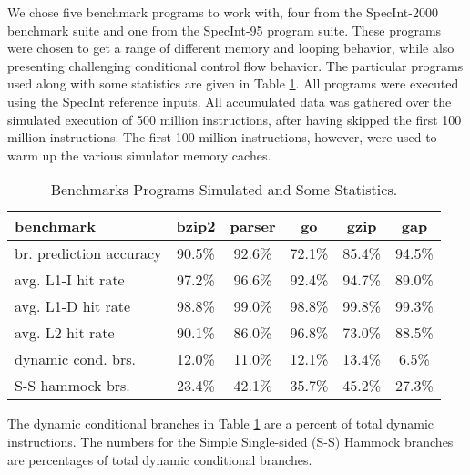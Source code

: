 \documentclass[10pt,dvips]{article}
\begin{document}
We chose five benchmark programs to work with,
four from the SpecInt-2000 benchmark suite
and one from the SpecInt-95 program suite.
These programs were chosen to get a range of different memory and looping
behavior, while also presenting challenging conditional control flow
behavior.
The particular programs used along with some statistics 
are given in Table \ref{tab:benches}.
All programs were executed using the SpecInt reference inputs.
All accumulated data was gathered over the simulated execution of
500 million instructions,
after having skipped the first 100 million instructions.
The first 100 million instructions, however, were used to warm up the
various simulator memory caches.
%
\begin{table}
\begin{center}
\caption{Benchmarks Programs Simulated and Some Statistics.}
\label{tab:benches}
\begin{tabular}{|l|c|c|c|c|c|}
\hline 
benchmark&bzip2&parser&go&gzip&gap\\
\hline 
\hline 
br. prediction accuracy&90.5\%&92.6\%&72.1\%&85.4\%&94.5\%\\
\hline 
avg. L1-I hit rate&97.2\%&96.6\%&92.4\%&94.7\%&89.0\%\\
\hline 
avg. L1-D hit rate&98.8\%&99.0\%&98.8\%&99.8\%&99.3\%\\
\hline 
avg. L2 hit rate&90.1\%&86.0\%&96.8\%&73.0\%&88.5\%\\
\hline 
dynamic cond. brs.&12.0\%&11.0\%&12.1\%&13.4\%&6.5\%\\
\hline 
S-S hammock brs.&23.4\%&42.1\%&35.7\%&45.2\%&27.3\%\\
\hline
\end{tabular}
\end{center}
\end{table}
%
The dynamic conditional branches in Table \ref{tab:benches} are
a percent of total dynamic instructions.
The numbers for the Simple Single-sided (S-S)
Hammock branches ~\cite{Fer87,Sank01}
are percentages of total dynamic conditional branches.
%
%
\end{document}
